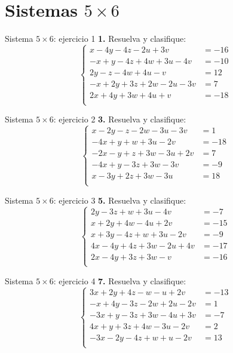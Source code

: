 \documentclass[aspectratio=169]{beamer}
\begin{document}
\section{Sistemas $5\times 6$}
\begin{frame}{Sistema $5\times 6$: ejercicio 1}
\scriptsize
\textbf{1.} Resuelva y clasifique:
\[\left\{\begin{aligned}
x-4y-4z-2u+3v&=-16\\
-x+y-4z+4w+3u-4v&=-10\\
2y-z-4w+4u-v&=12\\
-x+2y+3z+2w-2u-3v&=7\\
2x+4y+3w+4u+v&=-18\\
\end{aligned}\right.\]
\end{frame}
\begin{frame}{Sistema $5\times 6$: ejercicio 2}
\scriptsize
\textbf{3.} Resuelva y clasifique:
\[\left\{\begin{aligned}
x-2y-z-2w-3u-3v&=1\\
-4x+y+w+3u-2v&=-18\\
-2x-y+z+3w-3u+2v&=7\\
-4x+y-3z+3w-3v&=-9\\
x-3y+2z+3w-3u&=18\\
\end{aligned}\right.\]
\end{frame}
\begin{frame}{Sistema $5\times 6$: ejercicio 3}
\scriptsize
\textbf{5.} Resuelva y clasifique:
\[\left\{\begin{aligned}
2y-3z+w+3u-4v&=-7\\
x+2y+4w-4u+2v&=-15\\
x+3y-4z+w+3u-2v&=-9\\
4x-4y+4z+3w-2u+4v&=-17\\
2x-4y+3z+3w-v&=-16\\
\end{aligned}\right.\]
\end{frame}
\begin{frame}{Sistema $5\times 6$: ejercicio 4}
\scriptsize
\textbf{7.} Resuelva y clasifique:
\[\left\{\begin{aligned}
3x+2y+4z-w-u+2v&=-13\\
-x+4y-3z-2w+2u-2v&=1\\
-3x+y-3z+3w-4u+3v&=-7\\
4x+y+3z+4w-3u-2v&=2\\
-3x-2y-4z+w+u-2v&=13\\
\end{aligned}\right.\]
\end{frame}
\end{document}
